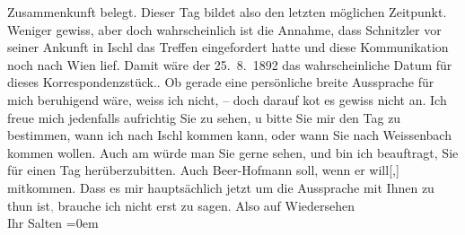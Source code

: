 \begin{ledgroupsized}[t]{13cm}
{{{                  Zusammenkunft belegt. Dieser Tag bildet also den letzten möglichen Zeitpunkt.
                  Weniger gewiss, aber doch wahrscheinlich ist die Annahme, dass Schnitzler vor seiner Ankunft in Ischl das Treffen eingefordert hatte und diese Kommunikation
                  noch nach Wien lief. Damit wäre der 25. 8. 1892
                  das wahrscheinliche Datum für dieses Korrespondenzstück.}}}\label{K_L03114-1h}. Ob gerade eine
               persönliche breite Aussprache für mich beruhigend wäre, weiss ich nicht, – doch
               darauf ko{\geminationm}t es gewiss nicht an. Ich freue mich
               jedenfalls aufrichtig Sie zu sehen, u bitte Sie mir den Tag zu bestimmen, wann ich
               nach Ischl kommen kann, oder wann Sie nach Weissenbach kommen wollen. Auch {\pb}am \label{K_L03114-2v}\label{K_L03114-2h} würde man Sie gerne sehen, und bin ich
               beauftragt, Sie für einen Tag herüberzubitten. Auch Beer-Hofmann soll, wenn er will{[},{]} mitkommen. Dass es mir
               hauptsächlich jetzt um die Aussprache mit Ihnen zu thun ist\textcolor{gray}{,} brauche ich nicht erst zu
               sagen.\pend
           \pstart
           Also auf Wiedersehen {\\[\baselineskip]}Ihr \spacefill\mbox{Salten}\pend
           \leftskip=0em{}
         
         \endnumbering{}\end{ledgroupsized}  \newcommand{\dateiname}{L03114}\newcommand{\titel}{Felix Salten an Arthur Schnitzler, [25.? 8. 1892]}\newcommand{\editorInnen}{Martin Anton Müller und Laura Untner}
      